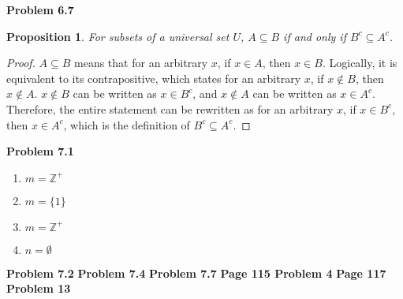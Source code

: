 \documentclass{article}
\newtheorem{prop}[thm]{Proposition}
\begin{document}
\textbf{Problem 6.7}
\begin{prop}
    For subsets of a universal set $U$, $A \subseteq B$ if and only if $B^c \subseteq A^c$.
\end{prop}
\begin{proof}
    $A \subseteq B$ means that for an arbitrary $x$, if $x \in A$, then $x \in B$. 
    Logically, it is equivalent to its contrapositive, which states for an arbitrary $x$, if $x \not \in B$, then $x \not \in A$.
    $x \not \in B$ can be written as $x \in B^c$, and $x \not \in A$ can be written as $x \in A^c$.
    Therefore, the entire statement can be rewritten as for an arbitrary $x$, if $x \in B^c$, then $x \in A^c$, which is the definition of $B^c \subseteq A^c$.
\end{proof}
\bigbreak

\textbf{Problem 7.1}
\begin{enumerate}[label={(\roman*)}]
    \item $m = \mathbb{Z^+}$
    \item $m = \{1\}$
    \item $m = \mathbb{Z^+}$
    \item $n = \emptyset$
\end{enumerate}
\bigbreak
\textbf{Problem 7.2}
\bigbreak
\textbf{Problem 7.4}
\bigbreak
\textbf{Problem 7.7}
\bigbreak
\textbf{Page 115 Problem 4}
\bigbreak
\textbf{Page 117 Problem 13}
\bigbreak
\end{document}
